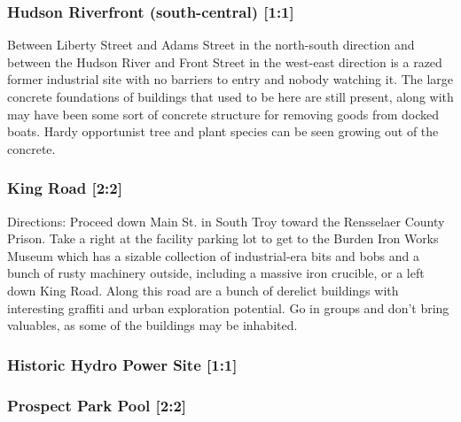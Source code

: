 \documentclass{article}
\begin{document}
\subsubsection{Hudson Riverfront (south-central) [1:1]}

Between Liberty Street and Adams Street in the north-south direction and between the Hudson River and Front Street in the west-east direction is a razed former industrial site with no barriers to entry and nobody watching it. The large concrete foundations of buildings that used to be here are still present, along with may have been some sort of concrete structure for removing goods from docked boats. Hardy opportunist tree and plant species can be seen growing out of the concrete.

\subsubsection{King Road [2:2]}
Directions: Proceed down Main St. in South Troy toward the Rensselaer County Prison. Take a right at the facility parking lot to get to the Burden Iron Works Museum which has a sizable collection of industrial-era bits and bobs and a bunch of rusty machinery outside, including a massive iron crucible, or a left down King Road. Along this road are a bunch of derelict buildings with interesting graffiti and urban exploration potential. Go in groups and don’t bring valuables, as some of the buildings may be inhabited.
\subsubsection{Historic Hydro Power Site [1:1]}
\subsubsection{Prospect Park Pool [2:2]}
\end{document}

